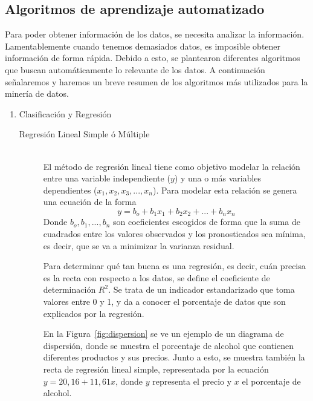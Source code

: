 \subsection{Algoritmos de aprendizaje automatizado}
Para poder obtener información de los datos, se necesita analizar la información. Lamentablemente cuando tenemos demasiados datos, es imposible obtener información de forma rápida. Debido a esto, se plantearon diferentes algoritmos que buscan automáticamente lo relevante de los datos.
A continuación señalaremos y haremos un breve resumen de los algoritmos más utilizados para la minería de datos.


\begin{enumerate}
  \item Clasificación y Regresión
    \begin{description}
      \item[Regresión Lineal Simple ó Múltiple] \hfill \\
      El método de regresión lineal tiene como objetivo modelar la relación entre una variable independiente ($y$) y una o más variables dependientes ($x_1, x_2, x_3,...,x_n$). Para modelar esta relación se genera una ecuación de la forma 
      \begin{equation}\label{rlineal}
      y= b_o + b_1 x_1 + b_2 x_2 + ... + b_n x_n 
      \end{equation}
      Donde $b_o,b_1,...,b_n$ son coeficientes escogidos de forma que la suma de cuadrados entre los valores observados y los pronosticados sea mínima, es decir, que se va a minimizar la varianza residual.
      
      Para determinar qué tan buena es una regresión, es decir, cuán precisa es la recta con respecto a los datos, se define el coeficiente de determinación $R^2$. Se trata de un indicador estandarizado que toma valores entre 0 y 1, y da a conocer el porcentaje de datos que son explicados por la regresión. 
      
      En la Figura~\ref{fig:dispersion} se ve un ejemplo de un diagrama de dispersión, donde se muestra el porcentaje de alcohol que contienen diferentes productos y sus precios. Junto a esto, se muestra también la recta de regresión lineal simple, representada por la ecuación $y=20,16+11,61x$, donde $y$ representa el precio y $x$ el porcentaje de alcohol. 
      

\end{description}
\end{enumerate}
